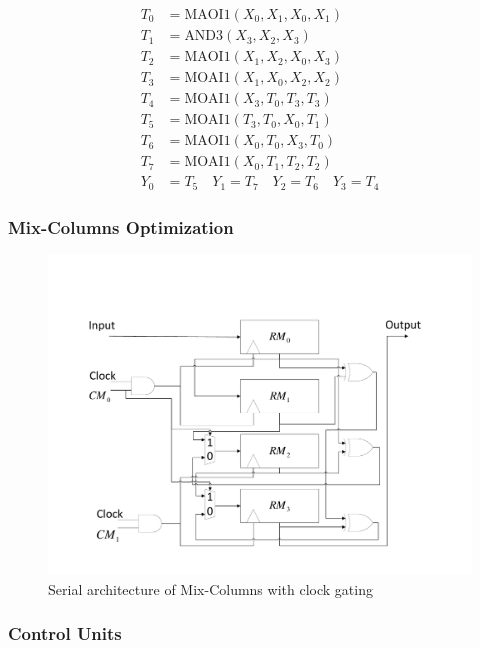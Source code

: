 \documentclass[sn-basic]{sn-jnl}%
\begin{document}
\begin{align}
    T_0 &= \text{MAOI1}(X_0, X_1, X_0, X_1) \nonumber \\
    T_1 &= \text{AND3}(X_3, X_2, X_3) \nonumber \\
    T_2 &= \text{MAOI1}(X_1, X_2, X_0, X_3) \nonumber \\
    T_3 &= \text{MOAI1}(X_1, X_0, X_2, X_2) \nonumber \\
    T_4 &= \text{MOAI1}(X_3, T_0, T_3, T_3) \nonumber \\
    T_5 &= \text{MOAI1}(T_3, T_0, X_0, T_1) \nonumber \\
    T_6 &= \text{MAOI1}(X_0, T_0, X_3, T_0) \nonumber \\
    T_7 &= \text{MOAI1}(X_0, T_1, T_2, T_2) \nonumber \\
    Y_0 &= T_5 \quad Y_1 = T_7 \quad Y_2 = T_6 \quad Y_3 = T_4  
     \label{eq2}
\end{align}

\subsubsection{Mix-Columns Optimization}\label{subsubsec2}

\begin{figure}[h]%
    \centering
    \includegraphics[width=\textwidth]{Mix-Columns.pdf}
    \caption{Serial architecture of Mix-Columns with clock gating}\label{serial_mix_columns_fig}
\end{figure}

\subsubsection{Control Units}\label{subsubsec3}
\end{document}
